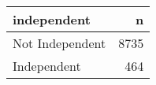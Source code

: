 \begin{table}[ht]
\centering
\begin{tabular}{lr}
  \hline
independent & n \\ 
  \hline
Not Independent & 8735 \\ 
  Independent & 464 \\ 
   \hline
\end{tabular}
\end{table}
